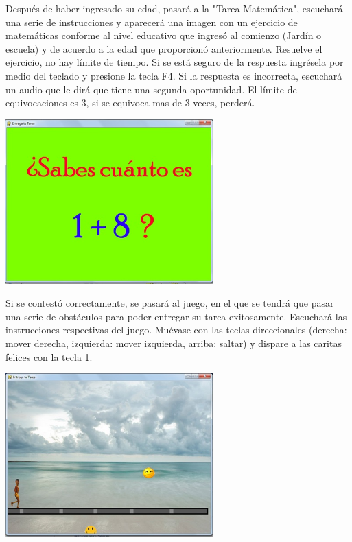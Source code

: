 \documentclass[12pt]{report}
\begin{document}
Después de haber ingresado su edad, pasará a la "Tarea Matemática", escuchará una serie de instrucciones y aparecerá una imagen con un ejercicio de matemáticas conforme al nivel educativo que ingresó al comienzo (Jardín o escuela) y de acuerdo a la edad que proporcionó anteriormente.
Resuelve el ejercicio, no hay límite de tiempo. Si se está seguro de la respuesta ingrésela por medio del teclado y presione la tecla F4.
Si la respuesta es incorrecta, escuchará un audio que le dirá que tiene una segunda oportunidad. El límite de equivocaciones es 3, si se equivoca mas de 3 veces, perderá.

	\begin{center}
		\begingroup
			\includegraphics[width=0.6\textwidth]{imagenes_usuario/ejercicio.jpg}
		\endgroup
	\end{center}



Si se contestó correctamente, se pasará al juego, en el que se tendrá que pasar una serie de obstáculos para poder entregar su tarea exitosamente.
Escuchará las instrucciones respectivas del juego.
Muévase con las teclas direccionales (derecha: mover derecha, izquierda: mover izquierda, arriba: saltar) y dispare a las caritas felices con la tecla 1.

	\begin{center}
		\begingroup
			\includegraphics[width=0.6\textwidth]{imagenes_usuario/juego1.jpg}
		\endgroup
	\end{center}
\end{document}
